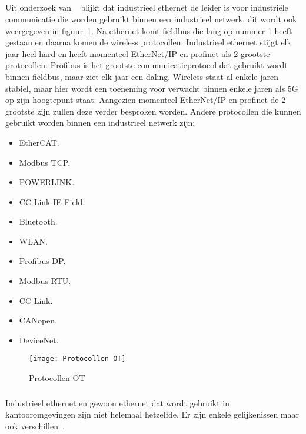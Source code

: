 \subsection{}
\label{subsec:OT protocollen}
Uit onderzoek van ~\textcite{Thomas2020} blijkt dat industrieel ethernet de leider is voor industriële communicatie die worden gebruikt binnen een industrieel netwerk, dit wordt ook weergegeven in figuur~\ref{fig:2.8}. Na ethernet komt fieldbus die lang op nummer 1 heeft gestaan en daarna komen de wireless protocollen. Industrieel ethernet stijgt elk jaar heel hard en heeft momenteel EtherNet/IP en profinet als 2 grootste protocollen. Profibus is het grootste communicatieprotocol dat gebruikt wordt binnen fieldbus, maar ziet elk jaar een daling. Wireless staat al enkele jaren stabiel, maar hier wordt een toeneming voor verwacht binnen enkele jaren als 5G op zijn hoogtepunt staat. Aangezien momenteel EtherNet/IP en profinet de 2 grootste zijn zullen deze verder besproken worden. Andere protocollen die kunnen gebruikt worden binnen een industrieel netwerk zijn:
\begin{itemize}
    \item EtherCAT.
    \item Modbus TCP.
    \item POWERLINK.
    \item CC-Link IE Field.
    \item Bluetooth.
    \item WLAN.
    \item Profibus DP.
    \item Modbus-RTU.
    \item CC-Link.
    \item CANopen.
    \item DeviceNet. 
\end{itemize}
\begin{figure}
    \texttt{[image: Protocollen OT]}
    \caption{Protocollen OT\autocite{Thomas2020} \label{fig:2.8}} 
\end{figure} 

\subsubsection{}
\label{subsubsec:Industrieel ethernet}
Industrieel ethernet en gewoon ethernet dat wordt gebruikt in kantooromgevingen zijn niet helemaal hetzelfde. Er zijn enkele gelijkenissen maar ook verschillen~\autocite{Tannehill2020}.

